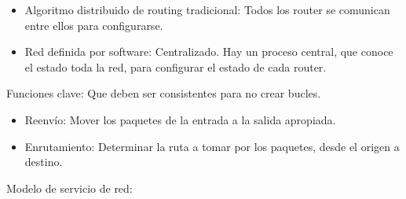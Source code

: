 \documentclass[12pt, twoside, openright]{report} %
\begin{document}
\begin{itemize}
\begin{itemize}
        \begin{itemize}
        \item
          Algoritmo distribuido de routing tradicional: Todos los router
          se comunican entre ellos para configurarse.
        \item
          Red definida por software: Centralizado. Hay un proceso
          central, que conoce el estado toda la red, para configurar el
          estado de cada router.
        \end{itemize}
      \end{itemize}
    \end{itemize}

	Funciones clave: Que deben ser consistentes para no crear bucles.

    \begin{itemize}
    \item
      Reenvío: Mover los paquetes de la entrada a la salida apropiada.
    \item
      Enrutamiento: Determinar la ruta a tomar por los paquetes, desde
      el origen a destino.
    \end{itemize}

	Modelo de servicio de red:
\end{document}
